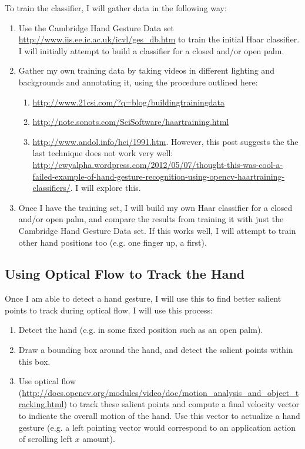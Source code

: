 \documentclass[12pt]{article}
\begin{document}
To train the classifier, I will gather data in the following way:
\begin{enumerate}
\item Use the Cambridge Hand Gesture Data set \url{http://www.iis.ee.ic.ac.uk/icvl/ges_db.htm} to train the initial Haar classifier. I will initially attempt to build a classifier for a closed and/or open palm.
\item Gather my own training data by taking videos in different lighting and backgrounds and annotating it, using the procedure outlined here: 
	\begin{enumerate}
	\item \url{http://www.21csi.com/?q=blog/buildingtrainingdata}
	\item \url{http://note.sonots.com/SciSoftware/haartraining.html}
	\item \url{http://www.andol.info/hci/1991.htm}. However, this post suggests the the last technique does not work very well: \url{http://cwyalpha.wordpress.com/2012/05/07/thought-this-was-cool-a-failed-example-of-hand-gesture-recognition-using-opencv-haartraining-classifiers/}. I will explore this.
\end{enumerate}
\item Once I have the training set, I will build my own Haar classifier for a closed and/or open palm, and compare the results from training it with just the Cambridge Hand Gesture Data set. If this works well, I will attempt to train other hand positions too (e.g. one finger up, a first).
\end{enumerate}

\subsection{Using Optical Flow to Track the Hand}

Once I am able to detect a hand gesture, I will use this to find better salient points to track during optical flow. I will use this process:

\begin{enumerate}
\item Detect the hand (e.g. in some fixed position such as an open palm). 
\item Draw a bounding box around the hand, and detect the salient points within this box.
\item Use optical flow (\url{http://docs.opencv.org/modules/video/doc/motion_analysis_and_object_tracking.html}) to track these salient points and compute a final velocity vector to indicate the overall motion of the hand. Use this vector to actualize a hand gesture (e.g. a left pointing vector would correspond to an application action of scrolling left $x$ amount). 
\end{enumerate}
\end{document}
